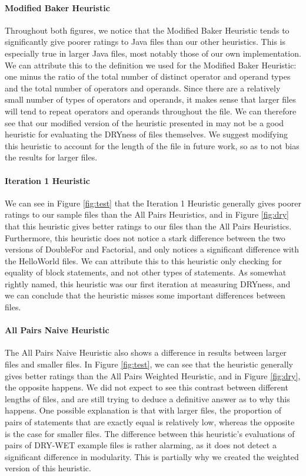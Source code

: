 \documentclass{article}
\begin{document}
\paragraph{Modified Baker Heuristic}
Throughout both figures, we notice that the Modified Baker Heuristic tends to significantly give poorer ratings to Java files
than our other heuristics. This is especially true in larger Java files, most notably those of our own implementation. We can attribute this to the definition we used for the Modified Baker Heuristic: one minus the ratio of the total number of distinct operator and operand types and the total number of operators and operands.
Since there are a relatively small number of types of operators and operands, it makes sense that larger files will tend to repeat
operators and operands throughout the file. We can therefore see that our modified version of the heuristic presented in \cite{Baker1979}
may not be a good heuristic for evaluating the DRYness of files themselves. We suggest modifying this heuristic to account for the length
of the file in future work, so as to not bias the results for larger files.

\paragraph{Iteration 1 Heuristic}
We can see in Figure \ref{fig:test} that the Iteration 1 Heuristic generally gives poorer ratings to our sample files than the All Pairs Heuristics, and in Figure \ref{fig:dry} that this heuristic gives better ratings to our files than the All Pairs Heuristics. Furthermore, this heuristic
does not notice a stark difference between the two versions of DoubleFor and Factorial, and only notices a significant difference with the HelloWorld files. We can attribute this to this heuristic only checking for equality of block statements, and not other types of statements.
As somewhat rightly named, this heuristic was our first iteration at measuring DRYness, and we can conclude that the heuristic misses
some important differences between files.

\paragraph{All Pairs Naive Heuristic}
The All Pairs Naive Heuristic also shows a difference in results between larger files and smaller files. In Figure \ref{fig:test}, we
can see that the heuristic generally gives better ratings than the All Pairs Weighted Heuristic, and in Figure \ref{fig:dry}, the opposite happens. We did not expect to see this contrast between different lengths of files, and are still trying to deduce a definitive answer as to why this happens. One possible explanation is that with larger files, the proportion of pairs of statements that are exactly
equal is relatively low, whereas the opposite is the case for smaller files. The difference between this heuristic's evaluations of pairs of DRY-WET example files is rather alarming, as it does not detect a significant difference in modularity. This is partially why we
created the weighted version of this heuristic.
\end{document}

